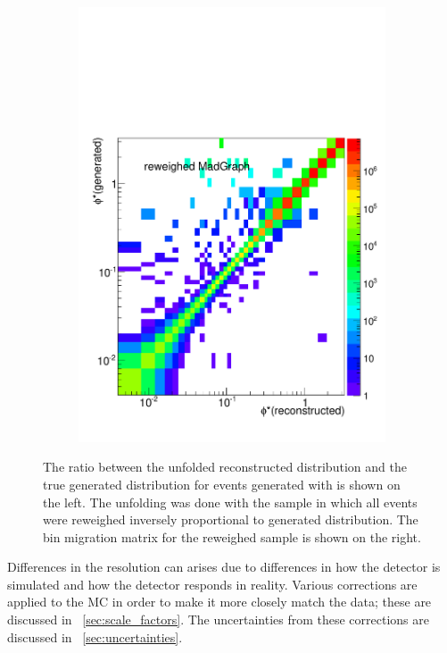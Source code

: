 \begin{figure}[!htbp]
\begin{subfigure}[b]{\SideBySidePlotWidth}
        \includegraphics[width=\textwidth]{figures/BinM_M_flat.pdf}
        \caption{}
        \label{fig:unfolding_flat_bin_migration}
    \end{subfigure}
    \caption{
        The ratio between the unfolded reconstructed \phistar distribution and
        the true generated \phistar distribution for \Ztoee events generated
        with \POWHEG is shown on the left. The unfolding was done with the
        \MADGRAPH sample in which all events were reweighed inversely
        proportional to generated \phistar distribution. The bin migration
        matrix for the reweighed \MADGRAPH sample is shown on the right.
    }
    \label{fig:flat_unfolding}
\end{figure}

Differences in the resolution can arises due to differences in how the
detector is simulated and how the detector responds in reality. Various
corrections are applied to the MC in order to make it more closely match the
data; these are discussed in \SEC~\ref{sec:scale_factors}. The uncertainties
from these corrections are discussed in \SEC~\ref{sec:uncertainties}.

